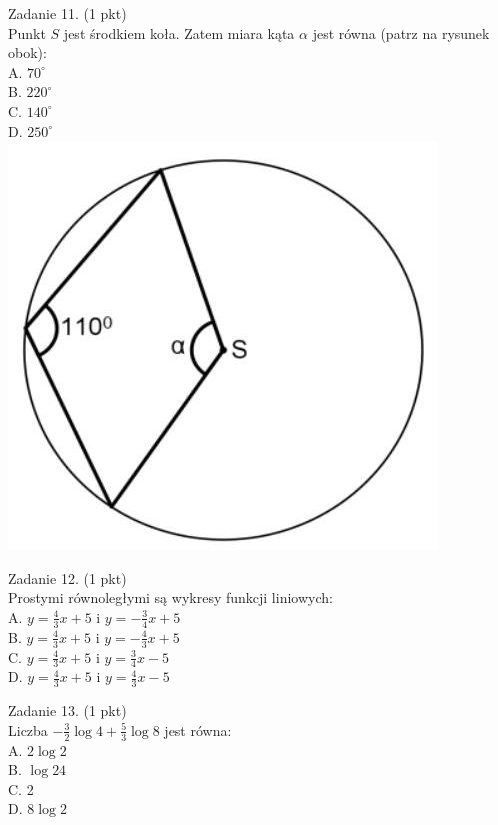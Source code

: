 \documentclass[10pt]{article}
\begin{document}
Zadanie 11. (1 pkt)\\
Punkt \(S\) jest środkiem koła. Zatem miara kąta \(\alpha\) jest równa (patrz na rysunek obok):\\
A. \(70^{\circ}\)\\
B. \(220^{\circ}\)\\
C. \(140^{\circ}\)\\
D. \(250^{\circ}\)\\
\includegraphics[max width=\textwidth, center]{2024_11_21_9a9f600c3b3af5013d80g-04(2)}

Zadanie 12. (1 pkt)\\
Prostymi równoległymi są wykresy funkcji liniowych:\\
A. \(y=\frac{4}{3} x+5\) i \(y=-\frac{3}{4} x+5\)\\
B. \(y=\frac{4}{3} x+5\) i \(y=-\frac{4}{3} x+5\)\\
C. \(y=\frac{4}{3} x+5\) i \(y=\frac{3}{4} x-5\)\\
D. \(y=\frac{4}{3} x+5\) i \(y=\frac{4}{3} x-5\)

Zadanie 13. (1 pkt)\\
Liczba \(-\frac{3}{2} \log 4+\frac{5}{3} \log 8\) jest równa:\\
A. \(2 \log 2\)\\
B. \(\log 24\)\\
C. 2\\
D. \(8 \log 2\)
\end{document}
